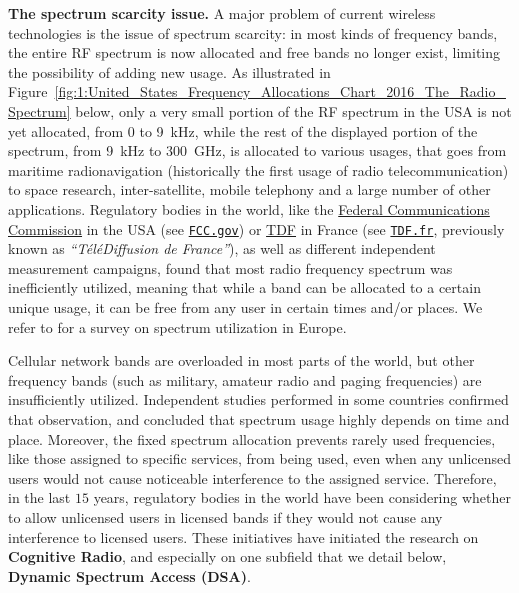 

\textbf{The spectrum scarcity issue.}
%
A major problem of current wireless technologies is the issue of spectrum scarcity:
in most kinds of frequency bands, the entire RF spectrum is now allocated and free bands no longer exist, limiting the possibility of adding new usage.
As illustrated in Figure~\ref{fig:1:United_States_Frequency_Allocations_Chart_2016_The_Radio_Spectrum} below, only a very small portion of the RF spectrum in the USA is not yet allocated, from $0$ to \SI{9}{\kilo\hertz}, while the rest of the displayed portion of the spectrum, from \SI{9}{\kilo\hertz} to \SI{300}{\giga\hertz}, is allocated to various usages, that goes from maritime radionavigation (historically the first usage of radio telecommunication) to space research, inter-satellite, mobile telephony and a large number of other applications.
%
Regulatory bodies in the world, like the \href{https://www.fcc.gov/}{Federal Communications Commission} in the USA (see \href{https://www.fcc.gov/}{\texttt{FCC.gov}})
or \href{http://www.tdf.fr/}{TDF} in France (see \href{https://www.TDF.fr/}{\texttt{TDF.fr}}, previously known as \emph{``TéléDiffusion de France''}), as well as different independent measurement campaigns, found that most radio frequency spectrum was inefficiently utilized,
meaning that while a band can be allocated to a certain unique usage, it can be free from any user in certain times and/or places.
We refer to \cite{valenta2010survey} for a survey on spectrum utilization in Europe.

Cellular network bands are overloaded in most parts of the world, but other frequency bands (such as military, amateur radio and paging frequencies) are insufficiently utilized.
Independent studies performed in some countries confirmed that observation, and concluded that spectrum usage highly depends on time and place.
Moreover, the fixed spectrum allocation prevents rarely used frequencies, like those assigned to specific services, from being used, even when any unlicensed users would not cause noticeable interference to the assigned service.
Therefore, in the last $15$ years, regulatory bodies in the world have been considering whether to allow unlicensed users in licensed bands if they would not cause any interference to licensed users.
These initiatives have initiated the research on \textbf{Cognitive Radio},
and especially on one subfield that we detail below, \textbf{Dynamic Spectrum Access (DSA)}.

